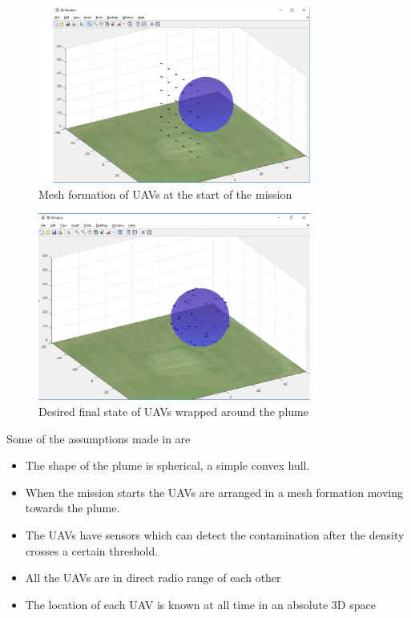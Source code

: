 \begin{figure}[hbtp]
\centering
\includegraphics[width=0.8\textwidth]{Chapter-3/figs/initial_drone_config}
\caption{Mesh formation of UAVs at the start of the mission}
\label{fig:mesh_formation}
\end{figure}

\begin{figure}[hbtp]
\centering
\includegraphics[width=0.8\textwidth]{Chapter-3/figs/final_formation}
\caption{Desired final state of UAVs wrapped around the plume}
\label{fig:final_state}
\end{figure}

Some of the assumptions made in \cite{8080382} are 
\begin{itemize}
\item{The shape of the plume is spherical, a simple convex hull.}
\item{When the mission starts the UAVs are arranged in a mesh formation moving towards the plume.}
\item{The UAVs have sensors which can detect the contamination after the density crosses a certain threshold.}
\item{All the UAVs are in direct radio range of each other}
\item{The location of each UAV is known at all time in an absolute 3D space}
\end{itemize}

